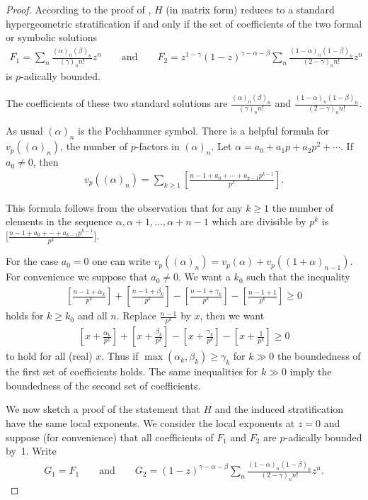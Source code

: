 \documentclass[pdftex]{sigma}
\numberwithin{equation}{section}
\begin{document}
 \begin{proof} According to the proof of \cite[Theorem~8.9]{Ma-vdP1}, $H$ (in matrix form) reduces to a standard hypergeometric stratification if and only if the set of coefficients of the two formal or symbolic solutions
 \begin{gather*}
 F_1=\sum _n \frac{(\alpha)_n(\beta)_n}{(\gamma)_nn!}z^n \qquad \text{and} \qquad F_2=z^{1-\gamma}(1-z)^{\gamma -\alpha -\beta} \sum _n\frac{(1-\alpha)_n(1-\beta )_n}{(2-\gamma)_nn!}z^n\end{gather*} is $p$-adically bounded.

 The coefficients of these two standard solutions are $\frac{(\alpha)_n(\beta)_n}{(\gamma)_nn!}$ and $\frac{(1-\alpha)_n(1-\beta )_n}{(2-\gamma)_nn!}$.

As usual $(\alpha )_n$ is the Pochhammer symbol. There is a helpful formula for $v_p((\alpha)_n)$, the number of $p$-factors in $(\alpha)_n$. Let $\alpha =a_0+a_1p+a_2p^2+\cdots $. If $a_0\neq 0$, then
\begin{gather*}
v_p((\alpha )_n)=\sum _{k\geq 1}\left[\frac{n-1+a_0+\cdots +a_{k-1}p^{k-1}}{p^k}\right] .\end{gather*}

This formula follows from the observation that for any $k\geq 1$ the number of elements in the sequence $\alpha, \alpha +1,\dots ,\alpha +n-1$ which are divisible by $p^k$ is $\big[\frac{n-1+a_0+\cdots +a_{k-1}p^{k-1}}{p^k}\big]$.

For the case $a_0=0$ one can write $v_p((\alpha)_n)=v_p(\alpha)+v_p((1+\alpha)_{n-1})$. For convenience we suppose that $a_0\neq 0$. We want a $k_0$ such that the inequality
\begin{gather*} \left[\frac{n-1+\alpha _k}{p^k}\right] + \left[\frac{n-1+\beta _k}{p^k}\right] -
\left[\frac{n-1+\gamma _k}{p^k}\right]- \left[\frac{n-1+1}{p^k}\right]\geq 0 \end{gather*}
 holds for $k\geq k_0$ and all $n$. Replace $\frac{n-1}{p^k}$ by $x$, then we want
\begin{gather*} \left[x+\frac{\alpha _k}{p^k}\right] + \left[x+\frac{\beta _k}{p^k}\right] -
\left[x+\frac{\gamma _k}{p^k}\right]- \left[x+\frac{1}{p^k}\right]\geq 0
\end{gather*}
to hold for all (real) $x$. Thus if $\max (\alpha _k,\beta _k)\geq \gamma_k$ for $k\gg 0$ the boundedness of the first set of coefficients holds. The same inequalities for $k\gg 0$ imply the boundedness of the second set of coefficients.

We now sketch a proof of the statement that $H$ and the induced stratification have the same local exponents. We consider the local exponents at $z=0$ and suppose (for convenience) that all coefficients of $F_1$ and $F_2$ are $p$-adically bounded by~1. Write
\begin{gather*} G_1=F_1 \qquad \text{and}\qquad G_2=(1-z)^{\gamma -\alpha -\beta}
 \sum _n\frac{(1-\alpha)_n(1-\beta )_n}{(2-\gamma)_nn!}z^n.\end{gather*}


\end{proof}
\end{document}
